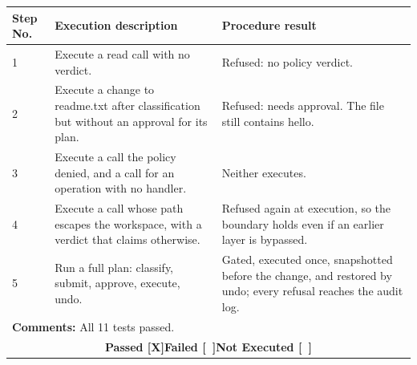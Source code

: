 \documentclass{FastFyp}
\begin{document}
{\begin{longtable}{|p{2.4cm}p{5.0cm}p{2.4cm}p{3.8cm}|}
\multicolumn{1}{|p{2.4cm}|}{\textbf{Step No.}} &
  \multicolumn{1}{p{5.0cm}|}{\textbf{Execution description}} &
  \multicolumn{2}{p{6.6cm}|}{\textbf{Procedure result}} \\ \hline
\multicolumn{1}{|p{2.4cm}|}{1} & \multicolumn{1}{p{5.0cm}|}{Execute a read call with no verdict.} & \multicolumn{2}{p{6.6cm}|}{Refused: no policy verdict.} \\ \hline
\multicolumn{1}{|p{2.4cm}|}{2} & \multicolumn{1}{p{5.0cm}|}{Execute a change to readme.txt after classification but without an approval for its plan.} & \multicolumn{2}{p{6.6cm}|}{Refused: needs approval. The file still contains hello.} \\ \hline
\multicolumn{1}{|p{2.4cm}|}{3} & \multicolumn{1}{p{5.0cm}|}{Execute a call the policy denied, and a call for an operation with no handler.} & \multicolumn{2}{p{6.6cm}|}{Neither executes.} \\ \hline
\multicolumn{1}{|p{2.4cm}|}{4} & \multicolumn{1}{p{5.0cm}|}{Execute a call whose path escapes the workspace, with a verdict that claims otherwise.} & \multicolumn{2}{p{6.6cm}|}{Refused again at execution, so the boundary holds even if an earlier layer is bypassed.} \\ \hline
\multicolumn{1}{|p{2.4cm}|}{5} & \multicolumn{1}{p{5.0cm}|}{Run a full plan: classify, submit, approve, execute, undo.} & \multicolumn{2}{p{6.6cm}|}{Gated, executed once, snapshotted before the change, and restored by undo; every refusal reaches the audit log.} \\ \hline
\multicolumn{4}{|p{14.8cm}|}{\textbf{Comments:} All 11 tests passed.} \\ \hline
\multicolumn{4}{|c|}{\textbf{Passed [X]\quad Failed [\ ]\quad Not Executed [\ ]}} \\ \hline
\end{longtable}
}
\end{document}
